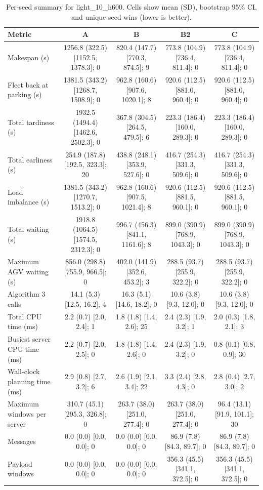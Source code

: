\begin{table}[t]
\centering
\caption{Per-seed summary for light\_10\_h600. Cells show mean (SD), bootstrap 95\% CI, and unique seed wins (lower is better).}
\label{tab:light-10-h600}
\begin{tabular}{lcccc}
\toprule
Metric & A & B & B2 & C \\
\midrule
Makespan (s) & 1256.8 (322.5) [1152.5, 1378.3]; 0 & 820.4 (147.7) [770.3, 874.5]; 9 & 773.8 (104.9) [736.4, 811.4]; 0 & 773.8 (104.9) [736.4, 811.4]; 0 \\
Fleet back at parking (s) & 1381.5 (343.2) [1268.7, 1508.9]; 0 & 962.8 (160.6) [907.6, 1020.1]; 8 & 920.6 (112.5) [881.0, 960.4]; 0 & 920.6 (112.5) [881.0, 960.4]; 0 \\
Total tardiness (s) & 1932.5 (1494.4) [1462.6, 2502.3]; 0 & 367.8 (304.5) [264.5, 479.5]; 6 & 223.3 (186.4) [160.0, 289.3]; 0 & 223.3 (186.4) [160.0, 289.3]; 0 \\
Total earliness (s) & 254.9 (187.8) [192.5, 323.3]; 20 & 438.8 (248.1) [353.9, 527.6]; 0 & 416.7 (254.3) [331.3, 509.6]; 0 & 416.7 (254.3) [331.3, 509.6]; 0 \\
Load imbalance (s) & 1381.5 (343.2) [1270.7, 1513.2]; 0 & 962.8 (160.6) [907.5, 1021.4]; 8 & 920.6 (112.5) [881.5, 960.1]; 0 & 920.6 (112.5) [881.5, 960.1]; 0 \\
Total waiting (s) & 1918.8 (1064.5) [1574.5, 2312.3]; 0 & 996.7 (456.3) [841.1, 1161.6]; 8 & 899.0 (390.9) [768.9, 1043.3]; 0 & 899.0 (390.9) [768.9, 1043.3]; 0 \\
Maximum AGV waiting (s) & 856.0 (298.8) [755.9, 966.5]; 0 & 402.0 (141.9) [352.6, 453.2]; 3 & 288.5 (93.7) [255.9, 322.2]; 0 & 288.5 (93.7) [255.9, 322.2]; 0 \\
Algorithm 3 calls & 14.1 (5.3) [12.5, 16.2]; 4 & 16.3 (5.1) [14.6, 18.2]; 0 & 10.6 (3.8) [9.3, 12.0]; 0 & 10.6 (3.8) [9.3, 12.0]; 0 \\
Total CPU time (ms) & 2.2 (0.7) [2.0, 2.4]; 1 & 1.8 (1.8) [1.4, 2.6]; 25 & 2.4 (2.3) [1.9, 3.2]; 1 & 2.0 (0.3) [1.8, 2.1]; 3 \\
Busiest server CPU time (ms) & 2.2 (0.7) [2.0, 2.5]; 0 & 1.8 (1.8) [1.4, 2.6]; 0 & 2.4 (2.3) [1.9, 3.2]; 0 & 0.8 (0.1) [0.8, 0.9]; 30 \\
Wall-clock planning time (ms) & 2.9 (0.8) [2.7, 3.2]; 6 & 2.6 (1.9) [2.1, 3.4]; 22 & 3.3 (2.4) [2.8, 4.3]; 0 & 2.8 (0.4) [2.7, 3.0]; 2 \\
Maximum windows per server & 310.7 (45.1) [295.3, 326.8]; 0 & 263.7 (38.0) [251.0, 277.4]; 0 & 263.7 (38.0) [251.0, 277.4]; 0 & 96.4 (13.1) [91.9, 101.1]; 30 \\
Messages & 0.0 (0.0) [0.0, 0.0]; 0 & 0.0 (0.0) [0.0, 0.0]; 0 & 86.9 (7.8) [84.3, 89.7]; 0 & 86.9 (7.8) [84.3, 89.7]; 0 \\
Payload windows & 0.0 (0.0) [0.0, 0.0]; 0 & 0.0 (0.0) [0.0, 0.0]; 0 & 356.3 (45.5) [341.1, 372.5]; 0 & 356.3 (45.5) [341.1, 372.5]; 0 \\
\bottomrule
\end{tabular}
\end{table}

